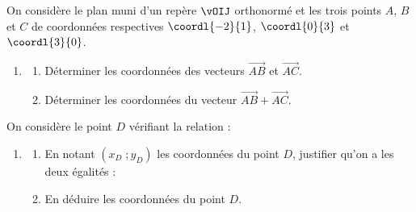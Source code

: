 \begin{exo}{}
	On considère le plan muni d'un repère $\vOIJ$ orthonormé et les trois points $A$, $B$ et $C$ de coordonnées respectives $\coordl{-2}{1}$, $\coordl{0}{3}$ et $\coordl{3}{0}$.

	\begin{enumerate}
		\item \begin{enumerate}
			      \item Déterminer les coordonnées des vecteurs $\vec{AB}$ et $\vec{AC}$.
			      \item Déterminer les coordonnées du vecteur $\vec{AB} + \vec{AC}$.
		      \end{enumerate}
	\end{enumerate}
	On considère le point $D$ vérifiant la relation : 
	\begin{enumerate}[resume]
		\item \begin{enumerate}
			      \item En notant $(x_D\;; y_D)$ les coordonnées du point $D$, justifier qu'on a les deux égalités :
			      \item En déduire les coordonnées du point $D$.
		      \end{enumerate}
	\end{enumerate}
\end{exo}
